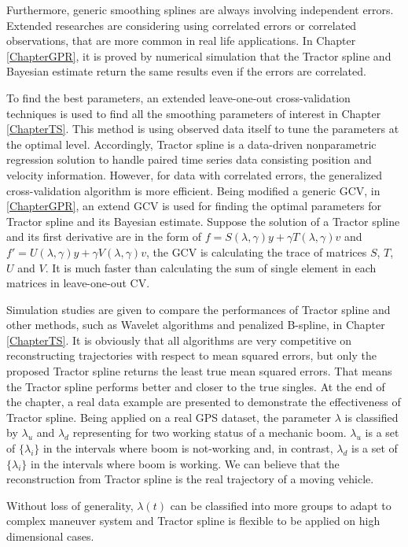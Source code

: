 Furthermore, generic smoothing splines are always involving independent errors. Extended researches are considering using correlated errors or correlated observations, that are more common in real life applications. In Chapter \ref{ChapterGPR}, it is proved by numerical simulation that the Tractor spline and Bayesian estimate return the same results even if the errors are correlated.  


To find the best parameters, an extended leave-one-out cross-validation techniques is used to find all the smoothing parameters of interest in Chapter \ref{ChapterTS}. This method is using observed data itself to tune the parameters at the optimal level. Accordingly, Tractor spline is a data-driven nonparametric regression solution to handle paired time series data consisting position and velocity information. However, for data with correlated errors, the generalized cross-validation algorithm is more efficient. Being modified a generic GCV, in \ref{ChapterGPR}, an extend GCV is used for finding the optimal parameters for Tractor spline and its Bayesian estimate. Suppose the solution of a Tractor spline and its first derivative are in the form of $f=S(\lambda,\gamma)y+\gamma T(\lambda,\gamma)v$ and $f'=U(\lambda,\gamma)y+\gamma V(\lambda,\gamma)v$, the GCV is calculating the trace of matrices $S$, $T$, $U$ and $V$. It is much faster than calculating the sum of single element in each matrices in leave-one-out CV. 


Simulation studies are given to compare the performances of Tractor spline and other methods, such as Wavelet algorithms and penalized B-spline, in Chapter \ref{ChapterTS}. It is obviously that all algorithms are very competitive on reconstructing trajectories with respect to mean squared errors, but only the proposed Tractor spline returns the least true mean squared errors. That means the Tractor spline performs better and closer to the true singles. At the end of the chapter, a real data example are presented to demonstrate the effectiveness of Tractor spline. Being applied on a real GPS dataset, the parameter $\lambda$ is classified by $\lambda_u$ and $\lambda_d$ representing for two working status of a mechanic boom. $\lambda_u$ is a set of $\{\lambda_i\}$ in the intervals where boom is not-working and, in contrast, $\lambda_d$ is a set of $\{\lambda_i\}$ in the intervals where boom is working. We can believe that the reconstruction from Tractor spline is the real trajectory of a moving vehicle. 


Without loss of generality, $\lambda(t)$ can be classified into more groups to adapt to complex maneuver system and Tractor spline is flexible to be applied on high dimensional cases. 


